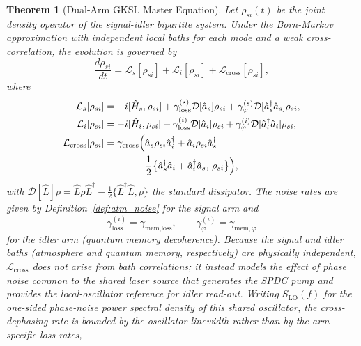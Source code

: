 \documentclass[journal]{IEEEtran}
\newtheorem{theorem}{Theorem}
\begin{document}
\begin{theorem}[Dual-Arm GKSL Master Equation]\label{thm:dual_gksl}
Let $\rho_{si}(t)$ be the joint density operator of the signal-idler bipartite system. Under the Born-Markov approximation with independent local baths for each mode and a weak cross-correlation, the evolution is governed by
\begin{equation}\label{eq:dual_gksl}
\frac{d\rho_{si}}{dt} = \mathcal{L}_s[\rho_{si}] + \mathcal{L}_i[\rho_{si}] + \mathcal{L}_{\text{cross}}[\rho_{si}],
\end{equation}
where
\begin{align}
\mathcal{L}_s[\rho_{si}] &= -i[\hat{H}_s, \rho_{si}] + \gamma_{\text{loss}}^{(s)}\mathcal{D}[\hat{a}_s]\rho_{si} + \gamma_{\varphi}^{(s)}\mathcal{D}[\hat{a}_s^\dagger\hat{a}_s]\rho_{si}, \label{eq:signal_liouvillian}\\
\mathcal{L}_i[\rho_{si}] &= -i[\hat{H}_i, \rho_{si}] + \gamma_{\text{loss}}^{(i)}\mathcal{D}[\hat{a}_i]\rho_{si} + \gamma_{\varphi}^{(i)}\mathcal{D}[\hat{a}_i^\dagger\hat{a}_i]\rho_{si}, \label{eq:idler_liouvillian}\\
\mathcal{L}_{\text{cross}}[\rho_{si}] &= \gamma_{\text{cross}}\Big(\hat{a}_s\rho_{si}\hat{a}_i^\dagger + \hat{a}_i\rho_{si}\hat{a}_s^\dagger \notag\\
&\qquad\quad - \frac{1}{2}\big\{\hat{a}_s^\dagger\hat{a}_i+\hat{a}_i^\dagger\hat{a}_s,\, \rho_{si}\big\}\Big), \label{eq:cross_liouvillian}
\end{align}
with $\mathcal{D}[\hat{L}]\rho = \hat{L}\rho\hat{L}^\dagger - \frac{1}{2}\{\hat{L}^\dagger\hat{L}, \rho\}$ the standard dissipator. The noise rates are given by Definition~\ref{def:atm_noise} for the signal arm and
\begin{equation}\label{eq:idler_noise_rates}
\gamma_{\text{loss}}^{(i)} = \gamma_{\text{mem,loss}}, \qquad \gamma_{\varphi}^{(i)} = \gamma_{\text{mem},\varphi}
\end{equation}
for the idler arm (quantum memory decoherence). Because the signal and idler baths (atmosphere and quantum memory, respectively) are physically independent, $\mathcal{L}_{\text{cross}}$ does \emph{not} arise from bath correlations; it instead models the effect of phase noise common to the shared laser source that generates the SPDC pump and provides the local-oscillator reference for idler read-out. Writing $S_{\text{LO}}(f)$ for the one-sided phase-noise power spectral density of this shared oscillator, the cross-dephasing rate is bounded by the oscillator linewidth rather than by the arm-specific loss rates,

\end{theorem}
\end{document}

